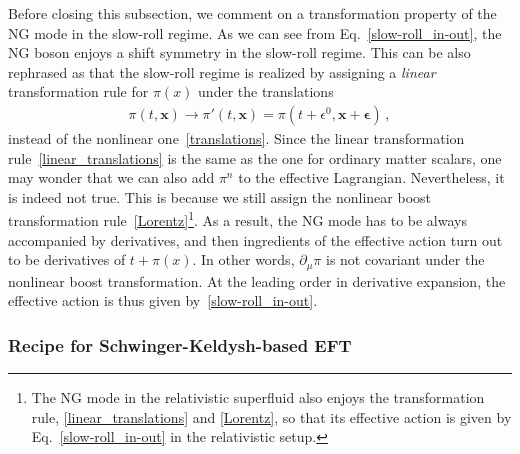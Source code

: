 \documentclass[a4paper,11pt]{article}
\begin{document}
\medskip
Before closing this subsection, we comment on a transformation property 
of the NG mode in the slow-roll regime.
As we can see from Eq.~\eqref{slow-roll_in-out}, 
the NG boson enjoys a shift symmetry in the slow-roll regime.  
This can be also rephrased as that the slow-roll regime is realized 
by assigning a {\it linear} transformation rule for $\pi(x)$ 
under the translations 
\begin{align}
 \label{linear_translations}
 \pi(t,\mathbf{x}) 
 \to \pi'(t,\mathbf{x}) 
 = \pi (t + \epsilon^0,\mathbf{x} + \mathbf{\epsilon}) \,,
\end{align}
instead of the nonlinear one~\eqref{translations}. 
Since the linear transformation rule~\eqref{linear_translations} 
is the same as the one for ordinary matter scalars, 
one may wonder that we can also add $\pi^{n}$ 
to the effective Lagrangian. 
Nevertheless, it is indeed not true. 
This is because we still assign the nonlinear 
boost transformation rule~\eqref{Lorentz}\footnote{
The NG mode in the relativistic superfluid also enjoys 
the transformation rule, \eqref{linear_translations} and \eqref{Lorentz}, 
so that its effective action is given by Eq.~\eqref{slow-roll_in-out} 
in the relativistic setup.}.
As a result, the NG mode has to be always accompanied by derivatives,
and then ingredients of the effective action 
turn out to be derivatives of $t+\pi(x)$.
In other words, $\partial_{\mu}\pi$ is not covariant under the nonlinear boost transformation.
At the leading order in derivative expansion, 
the effective action is thus given by~\eqref{slow-roll_in-out}.




\subsubsection{Recipe for Schwinger-Keldysh-based EFT}
\label{subsec:EFT_in-in}
\end{document}

